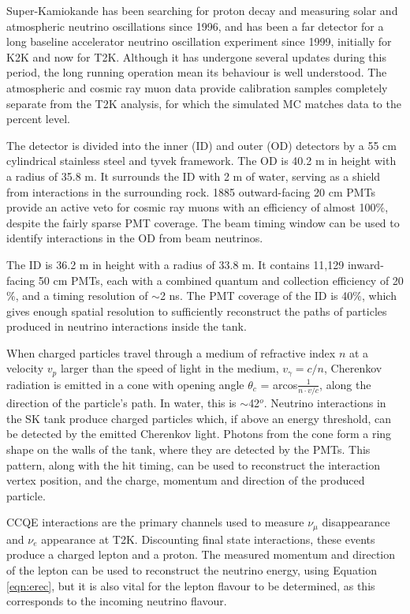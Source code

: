 Super-Kamiokande has been searching for proton decay and measuring solar and atmospheric neutrino oscillations since 1996, and has been a far detector for a long baseline accelerator neutrino oscillation experiment since 1999, initially for K2K and now for T2K. Although it has undergone several updates during this period, the long running operation mean its behaviour is well understood. The atmospheric and cosmic ray muon data provide calibration samples completely separate from the T2K analysis, for which the simulated MC matches data to the percent level.

The detector is divided into the inner (ID) and outer (OD) detectors by a 55 cm cylindrical stainless steel and tyvek framework. The OD is 40.2 m in height with a radius of 35.8 m. It surrounds the ID with 2 m of water, serving as a shield from interactions in the surrounding rock. 1885 outward-facing 20 cm PMTs provide an active veto for cosmic ray muons with an efficiency of almost 100$\%$, despite the fairly sparse PMT coverage. The beam timing window can be used to identify interactions in the OD from beam neutrinos.

The ID is 36.2 m in height with a radius of 33.8 m. It contains 11,129 inward-facing 50 cm PMTs, each with a combined quantum and collection efficiency of 20$\%$, and a timing resolution of $\sim$2 ns. The PMT coverage of the ID is 40$\%$, which gives enough spatial resolution to sufficiently reconstruct the paths of particles produced in neutrino interactions inside the tank.

When charged particles travel through a medium of refractive index $n$ at a velocity $v_p$ larger than the speed of light in the medium, $v_\gamma = c/n$, Cherenkov radiation is emitted in a cone with opening angle $\theta_c$ = arcos$\frac{1}{n\cdot v/c}$, along the direction of the particle's path. In water, this is $\sim$42$^o$. Neutrino interactions in the SK tank produce charged particles which, if above an energy threshold, can be detected by the emitted Cherenkov light. Photons from the cone form a ring shape on the walls of the tank, where they are detected by the PMTs. This pattern, along with the hit timing, can be used to reconstruct the interaction vertex position, and the charge, momentum and direction of the produced particle.

CCQE interactions are the primary channels used to measure $\nu_\mu$ disappearance and $\nu_e$ appearance at T2K. Discounting final state interactions, these events produce a charged lepton and a proton. The measured momentum and direction of the lepton can be used to reconstruct the neutrino energy, using Equation \ref{eqn:erec}, but it is also vital for the lepton flavour to be determined, as this corresponds to the incoming neutrino flavour.

